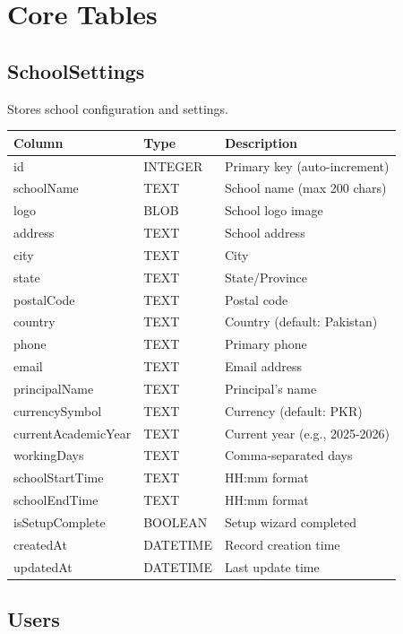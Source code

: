 \documentclass[12pt,a4paper]{report}
\begin{document}
\chapter{Core Tables}

\section{SchoolSettings}

Stores school configuration and settings.

\begin{longtable}{@{}p{4cm}p{2.5cm}p{6.5cm}@{}}
\toprule
\textbf{Column} & \textbf{Type} & \textbf{Description} \\
\midrule
\endhead
id & INTEGER & Primary key (auto-increment) \\
schoolName & TEXT & School name (max 200 chars) \\
logo & BLOB & School logo image \\
address & TEXT & School address \\
city & TEXT & City \\
state & TEXT & State/Province \\
postalCode & TEXT & Postal code \\
country & TEXT & Country (default: Pakistan) \\
phone & TEXT & Primary phone \\
email & TEXT & Email address \\
principalName & TEXT & Principal's name \\
currencySymbol & TEXT & Currency (default: PKR) \\
currentAcademicYear & TEXT & Current year (e.g., 2025-2026) \\
workingDays & TEXT & Comma-separated days \\
schoolStartTime & TEXT & HH:mm format \\
schoolEndTime & TEXT & HH:mm format \\
isSetupComplete & BOOLEAN & Setup wizard completed \\
createdAt & DATETIME & Record creation time \\
updatedAt & DATETIME & Last update time \\
\bottomrule
\end{longtable}

\section{Users}
\end{document}

